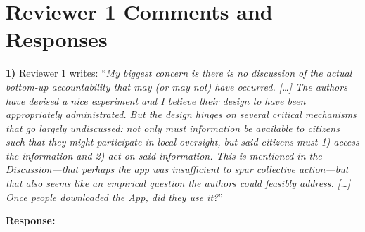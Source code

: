 \documentclass[12pt,a4paper,]{article}
\begin{document}
\hypertarget{reviewer-1-comments-and-responses}{%
\section{Reviewer 1 Comments and
Responses}\label{reviewer-1-comments-and-responses}}

\textbf{1)} Reviewer 1 writes: ``\emph{My biggest concern is there is no
discussion of the actual bottom-up accountability that may (or may not)
have occurred. {[}\ldots{}{]} The authors have devised a nice experiment
and I believe their design to have been appropriately administrated. But
the design hinges on several critical mechanisms that go largely
undiscussed: not only must information be available to citizens such
that they might participate in local oversight, but said citizens must
1) access the information and 2) act on said information. This is
mentioned in the Discussion---that perhaps the app was insufficient to
spur collective action---but that also seems like an empirical question
the authors could feasibly address. {[}\ldots{}{]} Once people
downloaded the App, did they use it?}''

\vspace{.5cm}

\noindent \textbf{Response:}
\end{document}
